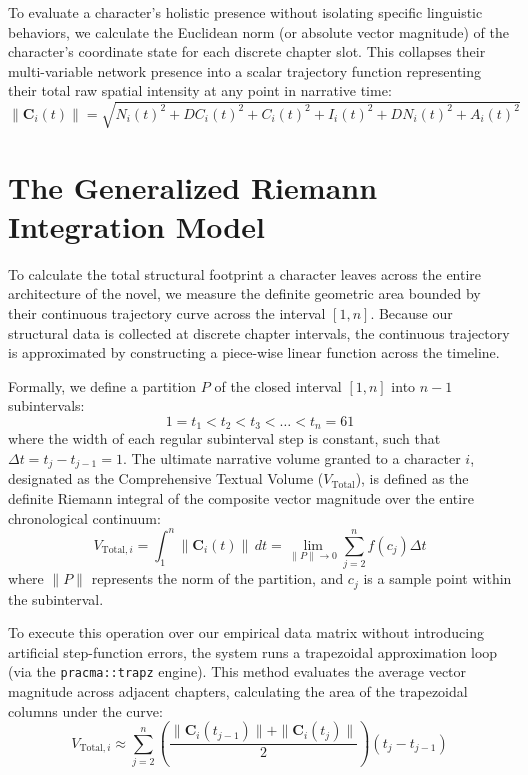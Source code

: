 To evaluate a character's holistic presence without isolating specific linguistic behaviors, we calculate the Euclidean norm (or absolute vector magnitude) of the character's coordinate state for each discrete chapter slot. This collapses their multi-variable network presence into a scalar trajectory function representing their total raw spatial intensity at any point in narrative time:
\begin{equation}
\|\mathbf{C}_{i}(t)\| = \sqrt{N_i(t)^2 + DC_i(t)^2 + C_i(t)^2 + I_i(t)^2 + DN_i(t)^2 + A_i(t)^2}
\end{equation}

\section{The Generalized Riemann Integration Model}
To calculate the total structural footprint a character leaves across the entire architecture of the novel, we measure the definite geometric area bounded by their continuous trajectory curve across the interval $[1, n]$. Because our structural data is collected at discrete chapter intervals, the continuous trajectory is approximated by constructing a piece-wise linear function across the timeline.

Formally, we define a partition $P$ of the closed interval $[1, n]$ into $n-1$ subintervals:
\begin{equation}
1 = t_1 < t_2 < t_3 < \dots < t_n = 61
\end{equation}
where the width of each regular subinterval step is constant, such that $\Delta t = t_{j} - t_{j-1} = 1$. The ultimate narrative volume granted to a character $i$, designated as the Comprehensive Textual Volume ($V_{\text{Total}}$), is defined as the definite Riemann integral of the composite vector magnitude over the entire chronological continuum:
\begin{equation}
V_{\text{Total}, i} = \int_{1}^{n} \|\mathbf{C}_{i}(t)\| \, dt = \lim_{\|P\| \to 0} \sum_{j=2}^{n} f(c_j) \Delta t
\end{equation}
where $\|P\|$ represents the norm of the partition, and $c_j$ is a sample point within the subinterval. 

To execute this operation over our empirical data matrix without introducing artificial step-function errors, the system runs a trapezoidal approximation loop (via the \texttt{pracma::trapz} engine). This method evaluates the average vector magnitude across adjacent chapters, calculating the area of the trapezoidal columns under the curve:
\begin{equation}
V_{\text{Total}, i} \approx \sum_{j=2}^{n} \left( \frac{\|\mathbf{C}_{i}(t_{j-1})\| + \|\mathbf{C}_{i}(t_j)\|}{2} \right) (t_j - t_{j-1})
\end{equation}

